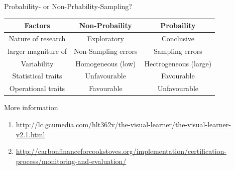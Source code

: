 \documentclass[10pt, compress]{beamer}
\begin{document}
\begin{frame}[t]{Probability- or Non-Prbability-Sampling?}
    \begin{table}
        \centering
        \begin{tabular}{|c|c|c|}
            \hline
            Factors & Non-Probaility & Probaility \\
            \hline
            \hline 
            Nature of research & Exploratory & Conclusive \\
            larger magniture of & Non-Sampling errors & Sampling errors \\
            Variability & Homogeneous (low) & Hectrogeneous (large) \\
            Statistical traits & Unfavourable & Favourable \\
            Operational traits & Favourable & Unfavourable \\
            \hline
        \end{tabular}
    \end{table}
\end{frame}

\begin{frame}[t]{More information}
    \begin{enumerate}
        \small
        \item \url{http://lc.gcumedia.com/hlt362v/the-visual-learner/the-visual-learner-v2.1.html}
        \item  \url{http://carbonfinanceforcookstoves.org/implementation/certification-process/monitoring-and-evaluation/}
    \end{enumerate}
\end{frame}
\end{document}
